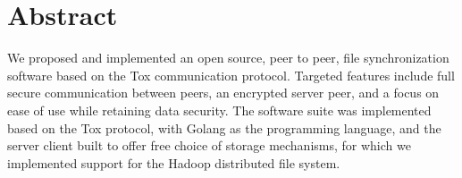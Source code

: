 \section*{Abstract}
\label{chap:abstract}

We proposed and implemented an open source, peer to peer, file synchronization software based on the Tox communication protocol.
Targeted features include full secure communication between peers, an encrypted server peer, and a focus on ease of use while retaining data security.
The software suite was implemented based on the Tox protocol, with Golang as the programming language, and the server client built to offer free choice of storage mechanisms, for which we implemented support for the Hadoop distributed file system.
